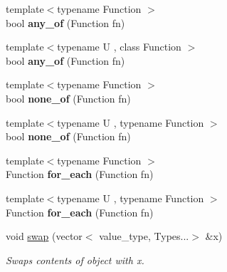 \begin{DoxyCompactItemize}
\item 
\hypertarget{classheterogeneous_1_1vector_3_01_t_00_01_types_8_8_8_4_a2877b41a02668d3bee2e1c631e60ba93}{}{\footnotesize template$<$typename Function $>$ }\\bool {\bfseries any\+\_\+of} (Function fn)\label{classheterogeneous_1_1vector_3_01_t_00_01_types_8_8_8_4_a2877b41a02668d3bee2e1c631e60ba93}

\item 
\hypertarget{classheterogeneous_1_1vector_3_01_t_00_01_types_8_8_8_4_a9a42d2c59697f8aefc2fcbba0e7f70ab}{}{\footnotesize template$<$typename U , class Function $>$ }\\bool {\bfseries any\+\_\+of} (Function fn)\label{classheterogeneous_1_1vector_3_01_t_00_01_types_8_8_8_4_a9a42d2c59697f8aefc2fcbba0e7f70ab}

\item 
\hypertarget{classheterogeneous_1_1vector_3_01_t_00_01_types_8_8_8_4_aa932c6239f96968b719742a30ebb6dfb}{}{\footnotesize template$<$typename Function $>$ }\\bool {\bfseries none\+\_\+of} (Function fn)\label{classheterogeneous_1_1vector_3_01_t_00_01_types_8_8_8_4_aa932c6239f96968b719742a30ebb6dfb}

\item 
\hypertarget{classheterogeneous_1_1vector_3_01_t_00_01_types_8_8_8_4_af388dfe8d34909150bbf844636893208}{}{\footnotesize template$<$typename U , typename Function $>$ }\\bool {\bfseries none\+\_\+of} (Function fn)\label{classheterogeneous_1_1vector_3_01_t_00_01_types_8_8_8_4_af388dfe8d34909150bbf844636893208}

\item 
\hypertarget{classheterogeneous_1_1vector_3_01_t_00_01_types_8_8_8_4_aadeeb3bba6b65d36a9d3861bbd0d8ae0}{}{\footnotesize template$<$typename Function $>$ }\\Function {\bfseries for\+\_\+each} (Function fn)\label{classheterogeneous_1_1vector_3_01_t_00_01_types_8_8_8_4_aadeeb3bba6b65d36a9d3861bbd0d8ae0}

\item 
\hypertarget{classheterogeneous_1_1vector_3_01_t_00_01_types_8_8_8_4_a1b19de695ce9fe1ee35671f74b882c1a}{}{\footnotesize template$<$typename U , typename Function $>$ }\\Function {\bfseries for\+\_\+each} (Function fn)\label{classheterogeneous_1_1vector_3_01_t_00_01_types_8_8_8_4_a1b19de695ce9fe1ee35671f74b882c1a}

\item 
\hypertarget{classheterogeneous_1_1vector_3_01_t_00_01_types_8_8_8_4_a1ea84c9e6597fc65ad39671073b688b3}{}void \hyperlink{classheterogeneous_1_1vector_3_01_t_00_01_types_8_8_8_4_a1ea84c9e6597fc65ad39671073b688b3}{swap} (vector$<$ value\+\_\+type, Types...$>$ \&x)\label{classheterogeneous_1_1vector_3_01_t_00_01_types_8_8_8_4_a1ea84c9e6597fc65ad39671073b688b3}

\begin{DoxyCompactList}\small\item\em Swaps contents of object with x. \end{DoxyCompactList}\end{DoxyCompactItemize}
